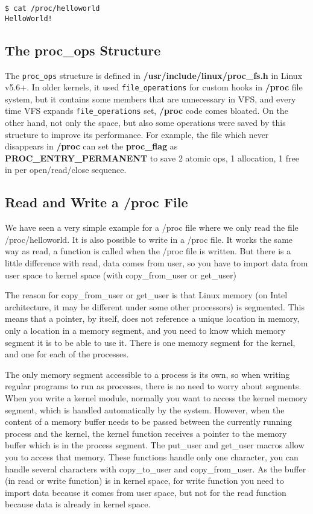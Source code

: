 \documentclass[10pt, oneside]{book}
\begin{document}
\begin{verbatim}
$ cat /proc/helloworld
HelloWorld!
\end{verbatim}


\subsection{The proc\_ops Structure}
\label{sec:proc_ops}
The \verb|proc_ops| structure is defined in \textbf{/usr/include/linux/proc\_fs.h} in Linux v5.6+.
In older kernels, it used \verb|file_operations| for custom hooks in \textbf{/proc} file system, but it contains some members that are unnecessary in VFS, and every time VFS expands \verb|file_operations| set, \textbf{/proc} code comes bloated.
On the other hand, not only the space, but also some operations were saved by this structure to improve its performance.
For example, the file which never disappears in \textbf{/proc} can set the \textbf{proc\_flag} as \textbf{PROC\_ENTRY\_PERMANENT} to save 2 atomic ops, 1 allocation, 1 free in per open/read/close sequence.

\subsection{Read and Write a /proc File}
\label{sec:read_write_procfs}
We have seen a very simple example for a /proc file where we only read the file /proc/helloworld.
It is also possible to write in a /proc file.
It works the same way as read, a function is called when the /proc file is written.
But there is a little difference with read, data comes from user, so you have to import data from user space to kernel space (with copy\_from\_user or get\_user)

The reason for copy\_from\_user or get\_user is that Linux memory (on Intel architecture, it may be different under some other processors) is segmented.
This means that a pointer, by itself, does not reference a unique location in memory, only a location in a memory segment, and you need to know which memory segment it is to be able to use it.
There is one memory segment for the kernel, and one for each of the processes.

The only memory segment accessible to a process is its own, so when writing regular programs to run as processes, there is no need to worry about segments.
When you write a kernel module, normally you want to access the kernel memory segment, which is handled automatically by the system.
However, when the content of a memory buffer needs to be passed between the currently running process and the kernel, the kernel function receives a pointer to the memory buffer which is in the process segment.
The put\_user and get\_user macros allow you to access that memory.
These functions handle only one character, you can handle several characters with copy\_to\_user and copy\_from\_user.
As the buffer (in read or write function) is in kernel space, for write function you need to import data because it comes from user space, but not for the read function because data is already in kernel space.
\end{document}
